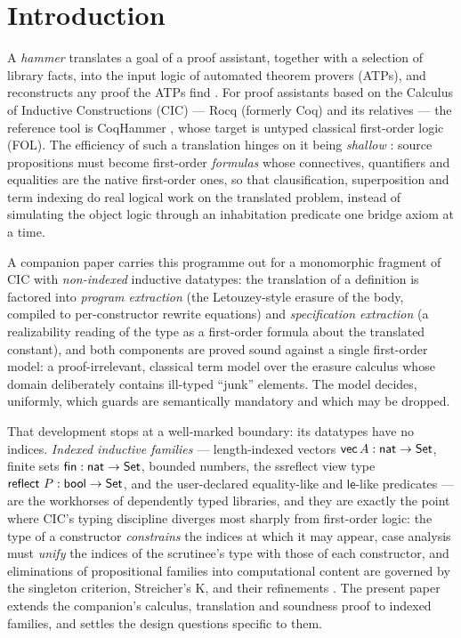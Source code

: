 \section{Introduction}
\label{sec:intro}

A \emph{hammer} translates a goal of a proof assistant, together with a
selection of library facts, into the input logic of automated theorem
provers (ATPs), and reconstructs any proof the ATPs find
\cite{BlanchetteEtAl2016qed}.  For proof assistants based on the Calculus
of Inductive Constructions (CIC) --- Rocq (formerly Coq) and its relatives
--- the reference tool is CoqHammer \cite{CzajkaKaliszyk2018,CoqHammer},
whose target is untyped classical first-order logic (FOL).  The efficiency
of such a translation hinges on it being \emph{shallow}
\cite{Czajka2018}: source propositions must become first-order
\emph{formulas} whose connectives, quantifiers and equalities are the
native first-order ones, so that clausification, superposition and term
indexing do real logical work on the translated problem, instead of
simulating the object logic through an inhabitation predicate one bridge
axiom at a time.

A companion paper \cite{Extraction2026} carries this programme out for a
monomorphic fragment of CIC with \emph{non-indexed} inductive datatypes:
the translation of a definition is factored into \emph{program extraction}
(the Letouzey-style erasure \cite{Letouzey2003,Letouzey2004} of the body,
compiled to per-constructor rewrite equations) and \emph{specification
extraction} (a realizability reading of the type as a first-order formula
about the translated constant), and both components are proved sound
against a single first-order model: a proof-irrelevant, classical term
model over the erasure calculus whose domain deliberately contains
ill-typed ``junk'' elements.  The model decides, uniformly, which guards
are semantically mandatory and which may be dropped.

That development stops at a well-marked boundary: its datatypes have no
indices.  \emph{Indexed inductive families} --- length-indexed vectors
$\mathsf{vec}\,A : \mathsf{nat} \to \mathsf{Set}$, finite sets $\mathsf{fin} : \mathsf{nat} \to \mathsf{Set}$, bounded
numbers, the ssreflect view type $\mathsf{reflect}\ P : \mathsf{bool} \to \mathsf{Set}$,
and the user-declared equality-like and $\mathsf{le}$-like predicates ---
are the workhorses of dependently typed libraries, and they are exactly
the point where CIC's typing discipline diverges most sharply from
first-order logic: the type of a constructor \emph{constrains} the indices
at which it may appear, case analysis must \emph{unify} the indices of the
scrutinee's type with those of each constructor, and eliminations of
propositional families into computational content are governed by the
singleton criterion, Streicher's K, and their refinements
\cite{GoguenEtAl2006,CockxEtAl2014,GilbertEtAl2019}.  The present paper
extends the companion's calculus, translation and soundness proof to
indexed families, and settles the design questions specific to them.

